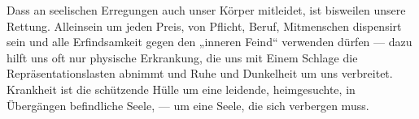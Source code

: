 Dass an seelischen Erregungen auch unser Körper mitleidet, ist bisweilen unsere Rettung. Alleinsein um jeden Preis, von Pflicht, Beruf, Mitmenschen dispensirt sein und alle Erfindsamkeit gegen den „inneren Feind“ verwenden dürfen — dazu hilft uns oft nur physische Erkrankung, die uns mit Einem Schlage die Repräsentationslasten abnimmt und Ruhe und Dunkelheit um uns verbreitet. Krankheit ist die schützende Hülle um eine leidende, heimgesuchte, in Übergängen befindliche Seele, — um eine Seele, die sich verbergen muss.
\par

